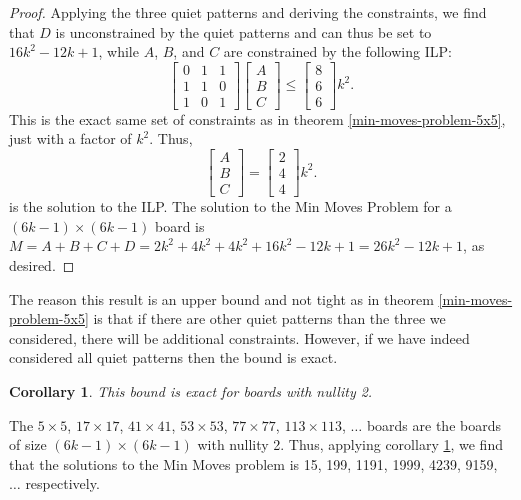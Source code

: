 \documentclass[a4paper]{article}
\newtheorem{corollary}{Corollary}
\begin{document}
\begin{proof}
		Applying the three quiet patterns and deriving the constraints, we find that $D$ is unconstrained by the quiet patterns and can thus be set to $16k^2 - 12k + 1$, while $A$, $B$, and $C$ are constrained by the following ILP:
		\begin{equation}
			\begin{bmatrix}
				0 & 1 & 1 \\
				1 & 1 & 0 \\
				1 & 0 & 1 
			\end{bmatrix}
			\begin{bmatrix}
				A \\
				B \\
				C
			\end{bmatrix}
			\leq
			\begin{bmatrix}
				8 \\
				6 \\
				6
			\end{bmatrix}k^2.
		\end{equation}
		This is the exact same set of constraints as in theorem \ref{min-moves-problem-5x5}, just with a factor of $k^2$.
		Thus,
		\begin{equation*}
			\begin{bmatrix}
				A \\
				B \\
				C
			\end{bmatrix}
			=
			\begin{bmatrix}
				2 \\
				4 \\
				4
			\end{bmatrix}k^2.
		\end{equation*}
		is the solution to the ILP.
		The solution to the Min Moves Problem for a $(6k-1) \times (6k-1)$ board is $M = A + B + C + D = 2k^2 + 4k^2 +  4k^2 + 16k^2 - 12k + 1 = 26k^2 - 12k + 1$, as desired.
	\end{proof}

	The reason this result is an upper bound and not tight as in theorem \ref{min-moves-problem-5x5} is that if there are other quiet patterns than the three we considered, there will be additional constraints.
	However, if we have indeed considered all quiet patterns then the bound is exact.

	\begin{corollary}\label{min-moves-6k-1-cor}
		This bound is exact for boards with nullity 2.
	\end{corollary}

	The $5 \times 5$, $17 \times 17$, $41 \times 41$, $53 \times 53$, $77 \times 77$, $113 \times 113$, $\dots$ boards are the boards of size $(6k-1) \times (6k-1)$ with nullity 2.
	Thus, applying corollary \ref{min-moves-6k-1-cor}, we find that the solutions to the Min Moves problem is 15, 199, 1191, 1999, 4239, 9159, $\dots$ respectively.
	
\end{document}
